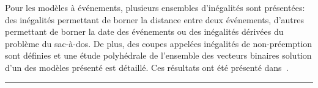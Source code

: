 \begin{center}
\begin{minipage}{\textwidth}
{      Pour les modèles à événements, plusieurs ensembles d'inégalités
      sont présentées: des inégalités permettant de borner la distance
      entre deux événements, d'autres permettant de borner la date des
      événements ou des inégalités dérivées du problème du
      sac-à-dos. De plus, des coupes appelées inégalités de
      non-préemption sont définies et une étude polyhédrale de
      l'ensemble des vecteurs binaires solution d'un des modèles
      présenté est détaillé. Ces résultats ont été présenté
      dans~\cite{Nattaf_ROADEF16,Nattaf_ECCO16}. }
    \vspace{0.5cm}
    \hrule
  \end{minipage}
\end{center}

 

